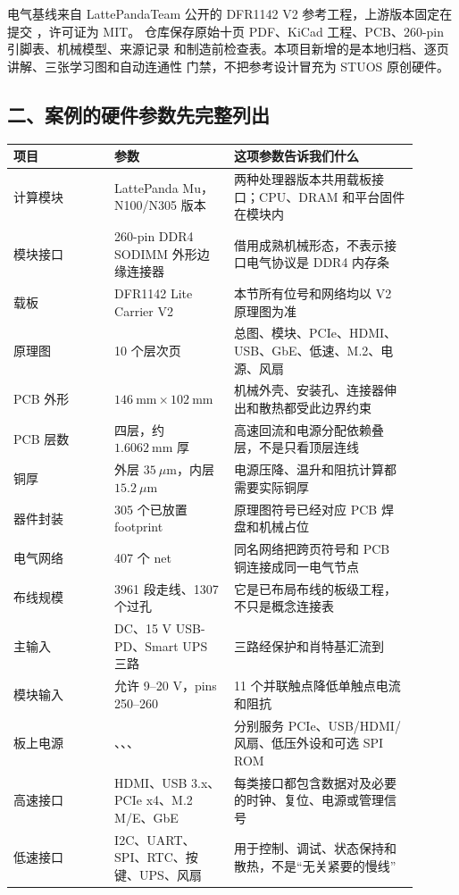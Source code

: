 %
电气基线来自 LattePandaTeam 公开的 DFR1142 V2 参考工程，上游版本固定在
提交 ，许可证为 MIT。
仓库保存原始十页 PDF、KiCad 工程、PCB、260-pin 引脚表、机械模型、来源记录
和制造前检查表。本项目新增的是本地归档、逐页讲解、三张学习图和自动连通性
门禁，不把参考设计冒充为 STUOS 原创硬件。

\subsection{二、案例的硬件参数先完整列出}

\begin{longtable}{L{0.23\linewidth}L{0.25\linewidth}L{0.42\linewidth}}
\toprule
项目 & 参数 & 这项参数告诉我们什么 \\
\midrule
计算模块 & LattePanda Mu，N100/N305 版本 & 两种处理器版本共用载板接口；CPU、DRAM 和平台固件在模块内 \\
模块接口 & 260-pin DDR4 SODIMM 外形边缘连接器 & 借用成熟机械形态，不表示接口电气协议是 DDR4 内存条 \\
载板 & DFR1142 Lite Carrier V2 & 本节所有位号和网络均以 V2 原理图为准 \\
原理图 & 10 个层次页 & 总图、模块、PCIe、HDMI、USB、GbE、低速、M.2、电源、风扇 \\
PCB 外形 & \(146\ \mathrm{mm}\times102\ \mathrm{mm}\) & 机械外壳、安装孔、连接器伸出和散热都受此边界约束 \\
PCB 层数 & 四层，约 \(1.6062\ \mathrm{mm}\) 厚 & 高速回流和电源分配依赖叠层，不是只看顶层连线 \\
铜厚 & 外层 \(35\ \mu\mathrm{m}\)，内层 \(15.2\ \mu\mathrm{m}\) & 电源压降、温升和阻抗计算都需要实际铜厚 \\
器件封装 & 305 个已放置 footprint & 原理图符号已经对应 PCB 焊盘和机械占位 \\
电气网络 & 407 个 net & 同名网络把跨页符号和 PCB 铜连接成同一电气节点 \\
布线规模 & 3961 段走线、1307 个过孔 & 它是已布局布线的板级工程，不只是概念连接表 \\
主输入 & DC、15 V USB-PD、Smart UPS 三路 & 三路经保护和肖特基汇流到  \\
模块输入 &  允许 9--20 V，pins 250--260 & 11 个并联触点降低单触点电流和阻抗 \\
板上电源 & 、、、 & 分别服务 PCIe、USB/HDMI/风扇、低压外设和可选 SPI ROM \\
高速接口 & HDMI、USB 3.x、PCIe x4、M.2 M/E、GbE & 每类接口都包含数据对及必要的时钟、复位、电源或管理信号 \\
低速接口 & I2C、UART、SPI、RTC、按键、UPS、风扇 & 用于控制、调试、状态保持和散热，不是“无关紧要的慢线” \\
\bottomrule
\end{longtable}

